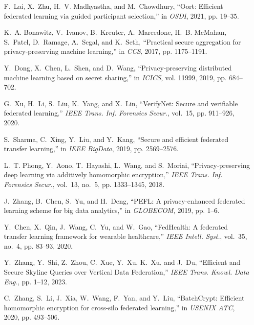 \documentclass[11pt]{article}
\begin{document}
\begin{thebibliography}{10}
F.~Lai, X.~Zhu, H.~V. Madhyastha, and M.~Chowdhury, ``Oort: Efficient federated
  learning via guided participant selection,'' in \emph{{OSDI}}, 2021, pp.
  19--35.

K.~A. Bonawitz, V.~Ivanov, B.~Kreuter, A.~Marcedone, H.~B. McMahan, S.~Patel,
  D.~Ramage, A.~Segal, and K.~Seth, ``Practical secure aggregation for
  privacy-preserving machine learning,'' in \emph{{CCS}}, 2017, pp. 1175--1191.

Y.~Dong, X.~Chen, L.~Shen, and D.~Wang, ``Privacy-preserving distributed
  machine learning based on secret sharing,'' in \emph{{ICICS}}, vol. 11999,
  2019, pp. 684--702.

G.~Xu, H.~Li, S.~Liu, K.~Yang, and X.~Lin, ``{VerifyNet}: Secure and verifiable
  federated learning,'' \emph{{IEEE} Trans. Inf. Forensics Secur.}, vol.~15,
  pp. 911--926, 2020.

S.~Sharma, C.~Xing, Y.~Liu, and Y.~Kang, ``Secure and efficient federated
  transfer learning,'' in \emph{{IEEE} BigData}, 2019, pp. 2569--2576.

L.~T. Phong, Y.~Aono, T.~Hayashi, L.~Wang, and S.~Moriai, ``Privacy-preserving
  deep learning via additively homomorphic encryption,'' \emph{{IEEE} Trans.
  Inf. Forensics Secur.}, vol.~13, no.~5, pp. 1333--1345, 2018.

J.~Zhang, B.~Chen, S.~Yu, and H.~Deng, ``{PEFL:} {A} privacy-enhanced federated
  learning scheme for big data analytics,'' in \emph{{GLOBECOM}}, 2019, pp.
  1--6.

Y.~Chen, X.~Qin, J.~Wang, C.~Yu, and W.~Gao, ``{FedHealth}: {A} federated
  transfer learning framework for wearable healthcare,'' \emph{{IEEE} Intell.
  Syst.}, vol.~35, no.~4, pp. 83--93, 2020.

Y.~Zhang, Y.~Shi, Z.~Zhou, C.~Xue, Y.~Xu, K.~Xu, and J.~Du, ``Efficient and Secure Skyline Queries over Vertical Data Federation,'' \emph{{IEEE} Trans. Knowl. Data Eng.}, pp. 1--12, 2023.

C.~Zhang, S.~Li, J.~Xia, W.~Wang, F.~Yan, and Y.~Liu, ``{BatchCrypt}: Efficient
  homomorphic encryption for cross-silo federated learning,'' in \emph{{USENIX}
  {ATC}}, 2020, pp. 493--506.


\end{thebibliography}
\end{document}
